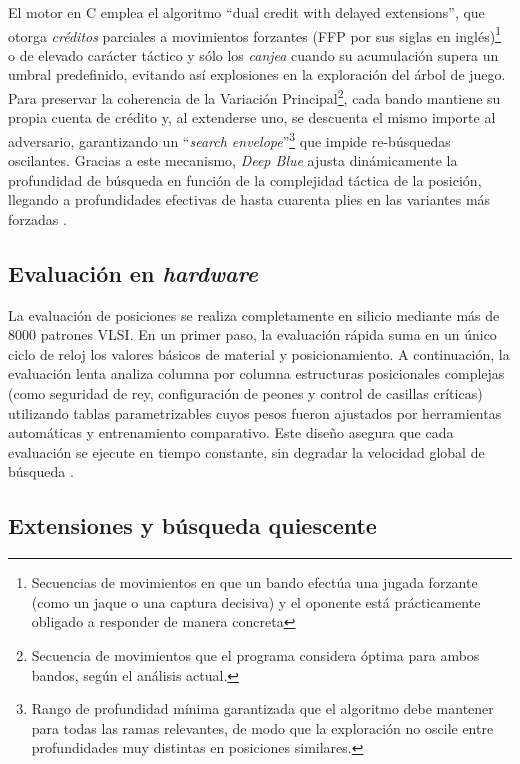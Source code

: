 \documentclass[a4paper, 12pt]{article}
\begin{document}
El motor en C emplea el algoritmo “dual credit with delayed 
extensions”, que otorga \emph{créditos} parciales a movimientos 
forzantes (FFP por sus siglas en inglés)\footnote{Secuencias de movimientos en que un 
bando efectúa una jugada forzante (como un jaque o una captura decisiva)
y el oponente está prácticamente obligado a responder de manera 
concreta} o de elevado carácter táctico  y sólo los 
\emph{canjea} cuando su acumulación supera un umbral predefinido, 
evitando así explosiones en la exploración del árbol de juego. 
Para preservar la coherencia de la 
Variación Principal\footnote{Secuencia de movimientos que el programa considera óptima para ambos bandos, según el análisis actual.}, 
cada bando mantiene su propia cuenta de 
crédito y, al extenderse uno, se descuenta el mismo importe al 
adversario, garantizando un “\emph{search envelope}”\footnote{Rango 
de profundidad mínima garantizada que el algoritmo debe mantener 
para todas las ramas relevantes, de modo que la exploración no 
oscile entre profundidades muy distintas en posiciones similares.} 
que impide 
re-búsquedas oscilantes. Gracias a este 
mecanismo, \textit{Deep Blue} ajusta dinámicamente la 
profundidad de búsqueda en función de la complejidad táctica de 
la posición, llegando a profundidades efectivas de hasta 
cuarenta plies en las variantes más forzadas \cite{campbell1999search}.

\subsection{Evaluación en \emph{hardware}}

La evaluación de posiciones se realiza completamente en 
silicio mediante más de 8000 patrones VLSI. En un primer paso, 
la evaluación rápida suma en un único ciclo de reloj los valores 
básicos de material y posicionamiento. A continuación, la 
evaluación lenta analiza columna por columna estructuras 
posicionales complejas (como seguridad de rey, configuración de 
peones y control de casillas críticas) utilizando tablas 
parametrizables cuyos pesos fueron ajustados por herramientas 
automáticas y entrenamiento comparativo. Este diseño asegura que cada 
evaluación se ejecute en tiempo constante, sin degradar la 
velocidad global de búsqueda \cite{campbell1999search}.

\subsection{Extensiones y búsqueda quiescente}
\end{document}
